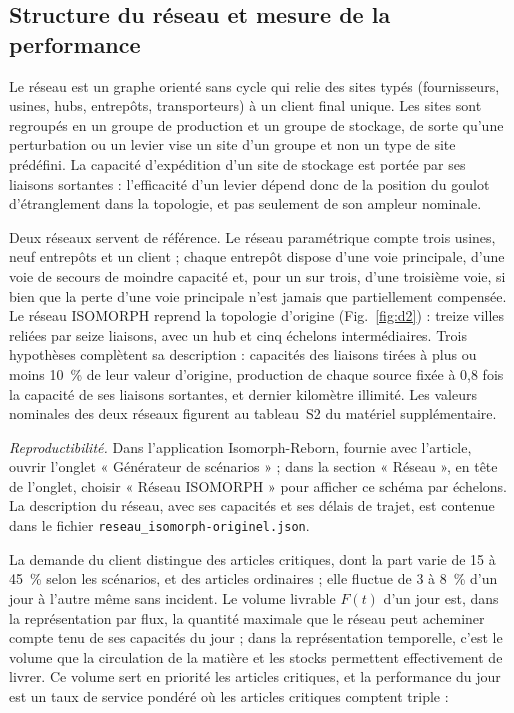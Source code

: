 \subsection{Structure du réseau et mesure de la performance}
\label{sec:3.2}

Le réseau est un graphe orienté sans cycle qui relie des sites typés (fournisseurs, usines, hubs, entrepôts, transporteurs) à un client final unique. Les sites sont regroupés en un groupe de production et un groupe de stockage, de sorte qu'une perturbation ou un levier vise un site d'un groupe et non un type de site prédéfini. La capacité d'expédition d'un site de stockage est portée par ses liaisons sortantes : l'efficacité d'un levier dépend donc de la position du goulot d'étranglement dans la topologie, et pas seulement de son ampleur nominale.

Deux réseaux servent de référence. Le réseau paramétrique compte trois usines, neuf entrepôts et un client ; chaque entrepôt dispose d'une voie principale, d'une voie de secours de moindre capacité et, pour un sur trois, d'une troisième voie, si bien que la perte d'une voie principale n'est jamais que partiellement compensée. Le réseau ISOMORPH reprend la topologie d'origine (Fig.~\ref{fig:d2}) : treize villes reliées par seize liaisons, avec un hub et cinq échelons intermédiaires. Trois hypothèses complètent sa description : capacités des liaisons tirées à plus ou moins 10~\% de leur valeur d'origine, production de chaque source fixée à 0,8 fois la capacité de ses liaisons sortantes, et dernier kilomètre illimité. Les valeurs nominales des deux réseaux figurent au tableau~S2 du matériel supplémentaire.

\begin{center}

\label{fig:d2}
\end{center}

\textit{Reproductibilité.} Dans l'application Isomorph-Reborn, fournie avec l'article, ouvrir l'onglet « Générateur de scénarios » ; dans la section « Réseau », en tête de l'onglet, choisir « Réseau ISOMORPH » pour afficher ce schéma par échelons. La description du réseau, avec ses capacités et ses délais de trajet, est contenue dans le fichier \texttt{reseau\_isomorph-originel.json}.

La demande du client distingue des articles critiques, dont la part varie de 15 à 45~\% selon les scénarios, et des articles ordinaires ; elle fluctue de 3 à 8~\% d'un jour à l'autre même sans incident. Le volume livrable $F(t)$ d'un jour est, dans la représentation par flux, la quantité maximale que le réseau peut acheminer compte tenu de ses capacités du jour ; dans la représentation temporelle, c'est le volume que la circulation de la matière et les stocks permettent effectivement de livrer. Ce volume sert en priorité les articles critiques, et la performance du jour est un taux de service pondéré où les articles critiques comptent triple :

